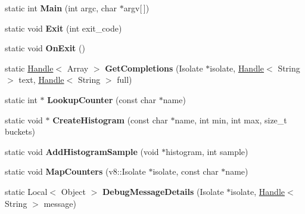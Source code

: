\begin{DoxyCompactItemize}
\item 
\hypertarget{classv8_1_1_shell_a057dfc36cac04373f5f6868b051be008}{}static int {\bfseries Main} (int argc, char $\ast$argv\mbox{[}$\,$\mbox{]})\label{classv8_1_1_shell_a057dfc36cac04373f5f6868b051be008}

\item 
\hypertarget{classv8_1_1_shell_aa9e863415a8d0f603a18a929651ebef6}{}static void {\bfseries Exit} (int exit\+\_\+code)\label{classv8_1_1_shell_aa9e863415a8d0f603a18a929651ebef6}

\item 
\hypertarget{classv8_1_1_shell_ab529390eceb986238fabe1023e8de7f0}{}static void {\bfseries On\+Exit} ()\label{classv8_1_1_shell_ab529390eceb986238fabe1023e8de7f0}

\item 
\hypertarget{classv8_1_1_shell_a38f7da8126b658120e1c22718cfcef40}{}static \hyperlink{classv8_1_1_handle}{Handle}$<$ Array $>$ {\bfseries Get\+Completions} (Isolate $\ast$isolate, \hyperlink{classv8_1_1_handle}{Handle}$<$ String $>$ text, \hyperlink{classv8_1_1_handle}{Handle}$<$ String $>$ full)\label{classv8_1_1_shell_a38f7da8126b658120e1c22718cfcef40}

\item 
\hypertarget{classv8_1_1_shell_ab3c2e43e32a1543b0a78f728bb3df63a}{}static int $\ast$ {\bfseries Lookup\+Counter} (const char $\ast$name)\label{classv8_1_1_shell_ab3c2e43e32a1543b0a78f728bb3df63a}

\item 
\hypertarget{classv8_1_1_shell_a59e39d63603b1766c86614c7a9db0545}{}static void $\ast$ {\bfseries Create\+Histogram} (const char $\ast$name, int min, int max, size\+\_\+t buckets)\label{classv8_1_1_shell_a59e39d63603b1766c86614c7a9db0545}

\item 
\hypertarget{classv8_1_1_shell_a0a1b3ff04a7253ba159519945ee7e2e8}{}static void {\bfseries Add\+Histogram\+Sample} (void $\ast$histogram, int sample)\label{classv8_1_1_shell_a0a1b3ff04a7253ba159519945ee7e2e8}

\item 
\hypertarget{classv8_1_1_shell_af8dc3050b831dab01d9532612f517a9c}{}static void {\bfseries Map\+Counters} (v8\+::\+Isolate $\ast$isolate, const char $\ast$name)\label{classv8_1_1_shell_af8dc3050b831dab01d9532612f517a9c}

\item 
\hypertarget{classv8_1_1_shell_a4f75ec52f903164fb98be4cd3cda49f2}{}static Local$<$ Object $>$ {\bfseries Debug\+Message\+Details} (Isolate $\ast$isolate, \hyperlink{classv8_1_1_handle}{Handle}$<$ String $>$ message)\label{classv8_1_1_shell_a4f75ec52f903164fb98be4cd3cda49f2}


\end{DoxyCompactItemize}

